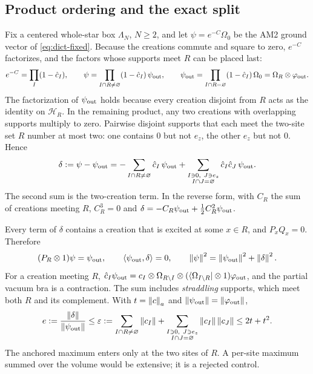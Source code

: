 \subsection{Product ordering and the exact split}
\label{sec:av1-split}
Fix a centered whole-star box $\Lambda_N$, $N\ge2$, and let $\psi=e^{-C}\Omega_0$
be the AM2 ground vector of \eqref{eq:dict-fixed}. Because the creations
commute and square to zero, $e^{-C}$ factorizes, and the factors whose supports
meet $R$ can be placed last:
\begin{equation}
 e^{-C}=\prod_I(1-\hat c_I),\qquad
 \psi=\prod_{I\cap R\ne\varnothing}(1-\hat c_I)\,\psi_{\rm out},\qquad
 \psi_{\rm out}=\prod_{I\cap R=\varnothing}(1-\hat c_I)\,\Omega_0
 =\Omega_R\otimes\varphi_{\rm out}.
 \label{eq:av1-order}
\end{equation}
The factorization of $\psi_{\rm out}$ holds because every creation disjoint
from $R$ acts as the identity on $\mathcal H_R$. In the remaining product, any
two creations with overlapping supports multiply to zero. Pairwise disjoint
supports that each meet the two-site set $R$ number at most two: one contains
$0$ but not $e_z$, the other $e_z$ but not $0$. Hence
\begin{equation}
 \delta:=\psi-\psi_{\rm out}
 =-\sum_{I\cap R\ne\varnothing}\hat c_I\,\psi_{\rm out}
 +\sum_{\substack{I\ni0,\ J\ni e_z\\ I\cap J=\varnothing}}\hat c_I\hat c_J\,\psi_{\rm out}.
 \label{eq:av1-delta}
\end{equation}
The second sum is the two-creation term. In the reverse form, with $C_R$ the
sum of creations meeting $R$, $C_R^3=0$ and
$\delta=-C_R\psi_{\rm out}+\tfrac12C_R^2\psi_{\rm out}$.

Every term of $\delta$ contains a creation that is excited at some $x\in R$,
and $P_xQ_x=0$. Therefore
\begin{equation}
 (P_R\otimes1)\psi=\psi_{\rm out},\qquad
 \langle\psi_{\rm out},\delta\rangle=0,\qquad
 \left\lVert\psi\right\rVert^2=\left\lVert\psi_{\rm out}\right\rVert^2+\left\lVert\delta\right\rVert^2 .
 \label{eq:av1-orth}
\end{equation}
For a creation meeting $R$,
$\hat c_I\psi_{\rm out}=c_I\otimes\Omega_{R\setminus I}\otimes
(\langle\Omega_{I\setminus R}|\otimes1)\varphi_{\rm out}$, and the partial
vacuum bra is a contraction. The sum includes \emph{straddling} supports,
which meet both $R$ and its complement. With $t=\left\lVert c\right\rVert_a$ and
$\left\lVert\psi_{\rm out}\right\rVert=\left\lVert\varphi_{\rm out}\right\rVert$,
\begin{equation}
 e:=\frac{\left\lVert\delta\right\rVert}{\left\lVert\psi_{\rm out}\right\rVert}\le\varepsilon
 :=\sum_{I\cap R\ne\varnothing}\left\lVert c_I\right\rVert
 +\sum_{\substack{I\ni0,\ J\ni e_z\\ I\cap J=\varnothing}}\left\lVert c_I\right\rVert\left\lVert c_J\right\rVert
 \le2t+t^2 .
 \label{eq:av1-eps}
\end{equation}
The anchored maximum enters only at the two sites of $R$. A per-site maximum
summed over the volume would be extensive; it is a rejected control.

